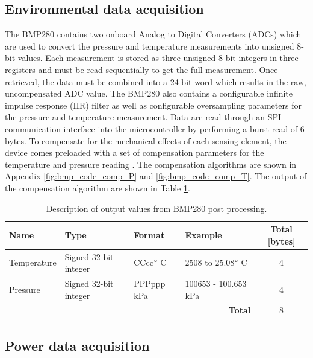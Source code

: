 \subsection{Environmental data acquisition}
The BMP280 contains two onboard Analog to Digital Converters (ADCs) which are used to convert the pressure and temperature measurements into unsigned 8-bit values. Each measurement is stored as three unsigned 8-bit integers in three registers and must be read sequentially to get the full measurement. Once retrieved, the data must be combined into a 24-bit word which results in the raw, uncompensated ADC value. The BMP280 also contains a configurable infinite impulse response (IIR) filter as well as configurable oversampling parameters for the pressure and temperature measurement. Data are read through an SPI communication interface into the microcontroller by performing a burst read of 6 bytes. To compensate for the mechanical effects of each sensing element, the device comes preloaded with a set of compensation parameters for the temperature and pressure reading \cite{BMP280_Datasheet}. The compensation algorithms are shown in Appendix \ref{fig:bmp_code_comp_P} and \ref{fig:bmp_code_comp_T}. The output of the compensation algorithm are shown in Table \ref{tab:BMP_output}.

\begin{table}[H]
	\centering
	\caption{Description of output values from BMP280 post processing.}
	\setlength{\extrarowheight}{5pt}
	\tiny
	\begin{tabular}{llllc}
		\hline
		\textbf{Name }& \textbf{Type} &\textbf{Format} & \textbf{Example} & \textbf{Total [bytes]}  \\
		\hline
		\hline
		Temperature & Signed 32-bit integer & CCcc$\degree$ C & 2508 to 25.08$\degree$ C & 4\\
		Pressure & Signed 32-bit integer & PPPppp kPa & 100653 - 100.653 kPa & 4\\
		\hline
		\hline
		\multicolumn{4}{r}{\textbf{Total}} & \multicolumn{1}{c}{8}\\
		\cline{5-5}
		\cline{5-5}
	\end{tabular}
	
	\label{tab:BMP_output}
\end{table}

\subsection{Power data acquisition}

